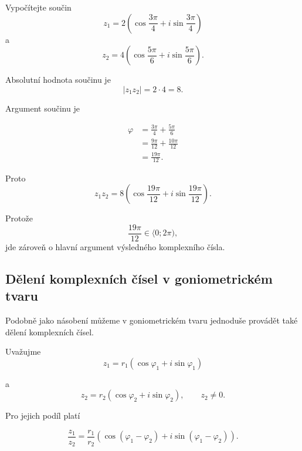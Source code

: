 \documentclass[12pt,a4paper]{article}
\begin{document}
\begin{examplebox}
    Vypočítejte součin
    \[
        z_1 = 2 \left(
                    \cos\frac{3\pi}{4}
                    +
                    i\sin\frac{3\pi}{4}
                \right)
    \]
    a
    \[    
        z_2 = 4 \left(
                    \cos\frac{5\pi}{6}
                    +
                    i\sin\frac{5\pi}{6}
                \right).
    \]

    Absolutní hodnota součinu je
    \[
        |z_1z_2| = 2 \cdot 4 = 8.
    \]

    Argument součinu je

    \begin{align*}
        \varphi &= \frac{3\pi}{4} + \frac{5\pi}{6}\\
                &= \frac{9\pi}{12} + \frac{10\pi}{12}\\
                &= \frac{19\pi}{12}.
    \end{align*}

    Proto
    \[
        z_1z_2 = 8  \left(
                        \cos\frac{19\pi}{12}
                        +
                        i\sin\frac{19\pi}{12}
                    \right).
    \]

    Protože
    \[
        \frac{19\pi}{12}\in\langle0;2\pi),
    \]
    jde zároveň o hlavní argument výsledného komplexního čísla.
\end{examplebox}


\subsection{Dělení komplexních čísel v goniometrickém tvaru}
Podobně jako násobení můžeme v goniometrickém tvaru jednoduše provádět 
také dělení komplexních čísel.

Uvažujme
\[
    z_1 = r_1   \left(
                    \cos\varphi_1+i\sin\varphi_1
                \right)
\]          

a
\[
    z_2 = r_2   \left(
                    \cos\varphi_2+i\sin\varphi_2
                \right),
    \qquad z_2\neq0.
\]

Pro jejich podíl platí

\[
    \frac{z_1}{z_2} = \frac{r_1}{r_2}   \left(
                                            \cos(\varphi_1-\varphi_2)
                                            +
                                            i\sin(\varphi_1-\varphi_2)
                                        \right).
\]
\end{document}
